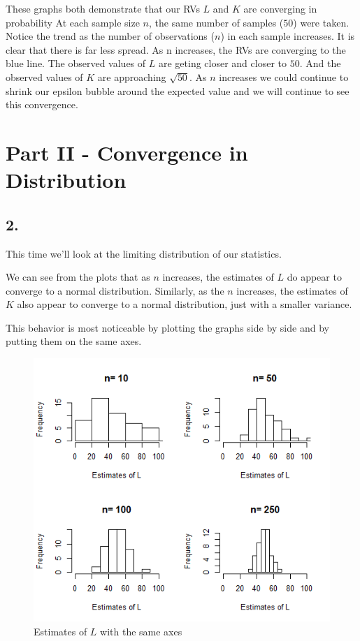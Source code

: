 \documentclass[12pt]{article}
\begin{document}
These graphs both demonstrate that our RVs $L$ and $K$ are converging in probability At each sample size $n$, the same number of samples ($50$) were taken.  Notice the trend as the number of observations ($n$) in each sample increases. It is clear that there is far less spread. As n increases, the RVs are converging to the blue line. The observed values of $L$ are geting closer and closer to $50$. And the observed values of $K$ are approaching $\sqrt{50}$.  As $n$ increases we could continue to shrink our epsilon bubble around the expected value and we will continue to see this convergence.


\section{Part II - Convergence in Distribution}

\subsection{2.}
This time we’ll look at the limiting distribution of our statistics.


We can see from the plots that as $n$ increases, the estimates of $L$ do appear to converge to a normal distribution. Similarly, as the $n$ increases, the estimates of $K$ also appear to converge to a normal distribution, just with a smaller variance. 

This behavior is most noticeable by plotting the graphs side by side and by putting them on the same axes.

\begin{figure}[H]
	\centering
	\includegraphics[scale = 0.6]{img/problem2/Problem_2_L.png}
	\caption{Estimates of $L$ with the same axes}
\end{figure}
\end{document}
